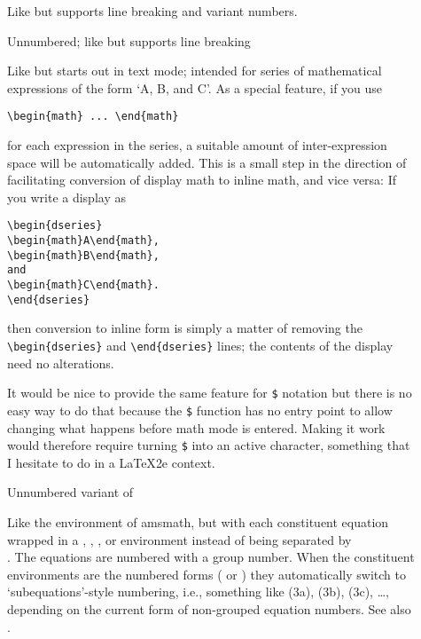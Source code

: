 \documentclass{article}
\def\latex/{{\protect\LaTeX}}
\newcommand{\ntt}{\normalfont\ttfamily}
\DeclareRobustCommand{\pkg}[1]{{\ntt#1}}
\newcommand\dbslash[1]{\texttt{\string\\}}
\begin{document}
\begin{description}
\item[] Like  but supports line breaking and variant
numbers.

\item[] Unnumbered; like  but supports line
breaking

\item[] Like  but starts out in text mode;
intended for series of mathematical expressions of the form `A, B, and
C'. As a special feature, if you use
\begin{verbatim}
\begin{math} ... \end{math}
\end{verbatim}
for each expression in the series, a suitable amount of inter-expression
space will be automatically added. This is a small step in the direction of
facilitating conversion of display math to inline math, and vice versa: If
you write a display as
\begin{verbatim}
\begin{dseries}
\begin{math}A\end{math},
\begin{math}B\end{math},
and
\begin{math}C\end{math}.
\end{dseries}
\end{verbatim}
then conversion to inline form is simply a matter of removing the
\verb'\begin{dseries}' and \verb'\end{dseries}' lines; the contents of the
display need no alterations.

It would be nice to provide the same feature for \verb'$' notation but
there is no easy way to do that because the \verb'$' function has no
entry point to allow changing what happens before math mode is entered.
Making it work would therefore require turning \verb'$' into an active
character, something that I hesitate to do in a \latex/2e context.

\item[] Unnumbered variant of 

\item[] Like the  environment of \pkg{amsmath},
but with each constituent equation wrapped in a ,
, , or  environment instead of being
separated by \dbslash/. The equations are numbered with a group number.
When the constituent environments are the numbered forms ( or
) they automatically switch to `subequations'-style
numbering, i.e., something like (3a), (3b), (3c), \dots, depending on
the current form of non-grouped equation numbers. See also
.


\end{description}
\end{document}
